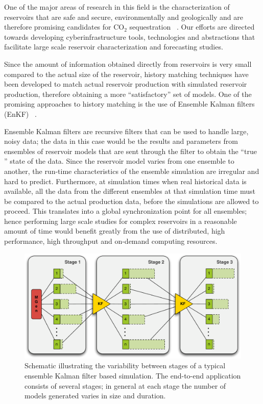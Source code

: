 \documentclass[conference,final]{IEEEtran}
\begin{document}
One of the major areas of research in this field is the characterization of reservoirs 
that are safe and secure, environmentally 
and geologically and are therefore promising candidates for CO$_2$ sequestration 
~\cite{GeoRPT,Luigi}. Our efforts are directed 
towards developing cyberinfrastructure tools, technologies and abstractions that 
facilitate large scale reservoir characterization 
and forecasting studies.

Since the amount of information obtained directly from reservoirs is very small compared 
to the actual size of the reservoir, 
history matching techniques have been developed to match actual reservoir production with 
simulated reservoir production, 
therefore obtaining a more ``satisfactory'' set of models. One of the promising approaches 
to history matching is the use of Ensemble Kalman filters (EnKF) ~\cite{KalmanPaper, 
DO2007, LiEnKF07, DO2006}.

Ensemble Kalman filters are recursive filters that can be used to handle large, noisy 
data; the data in this case would be the results and parameters from ensembles of 
reservoir models that are sent through the filter to obtain the ``true '' state of the 
data. Since the reservoir model varies from one ensemble to another, the run-time 
characteristics of the ensemble simulation are irregular and hard to predict. Furthermore, 
at simulation times when real historical data is available, all the data from the 
different ensembles at that simulation time must be compared to the actual production 
data, before the simulations are allowed to proceed. This translates into a global 
synchronization point for all ensembles; hence performing large scale studies for complex 
reservoirs in a reasonable amount of time would benefit greatly from the use of 
distributed, high performance, high throughput and on-demand computing resources.

\begin{figure}
\begin{center}
\includegraphics*[scale=0.33,angle=0]{figures/3StageKalmanFilter}
\end{center}
\caption{Schematic illustrating the variability between stages of a typical
  ensemble Kalman filter based simulation. The end-to-end
  application consists of several stages; in general at each stage the
  number of models generated varies in size and duration.}
\label{fig:irregular_execution}
\end{figure}
\end{document}
